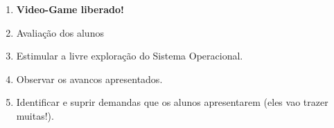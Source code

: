 \begin{enumerate}
	\item \textbf{Video-Game liberado!}
	\item Avaliação dos alunos
	\item Estimular a livre exploração do Sistema Operacional.
	\item Observar os avancos apresentados.
	\item Identificar e suprir demandas que os alunos apresentarem (eles vao trazer muitas!).
\end{enumerate}

